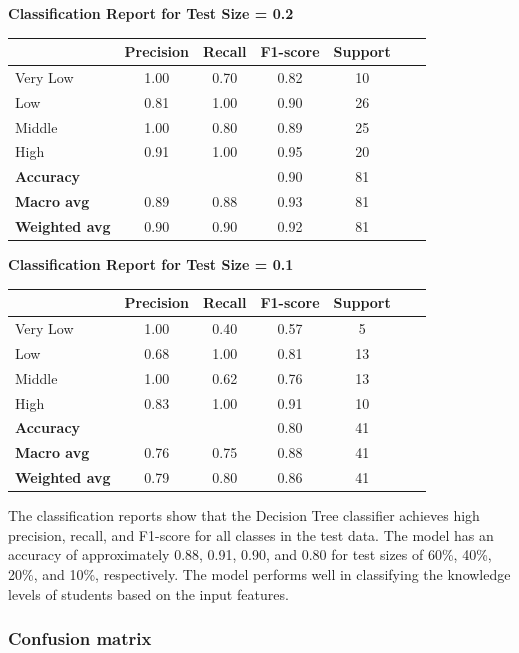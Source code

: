 \vspace{2em}

\textbf{Classification Report for Test Size = 0.2}

\begin{tabular}{lcccccc}
\hline
 & \textbf{Precision} & \textbf{Recall} & \textbf{F1-score} & \textbf{Support} \\
\hline
Very Low & 1.00 & 0.70 & 0.82 & 10 \\
Low & 0.81 & 1.00 & 0.90 & 26 \\
Middle & 1.00 & 0.80 & 0.89 & 25 \\
High & 0.91 & 1.00 & 0.95 & 20 \\
\hline
\textbf{Accuracy} & & & 0.90 & 81 \\
\textbf{Macro avg} & 0.89 & 0.88 & 0.93 & 81 \\
\textbf{Weighted avg} & 0.90 & 0.90 & 0.92 & 81 \\
\hline
\end{tabular}

\vspace{200em}

\textbf{Classification Report for Test Size = 0.1}

\begin{tabular}{lcccccc}
\hline
 & \textbf{Precision} & \textbf{Recall} & \textbf{F1-score} & \textbf{Support} \\
\hline
Very Low & 1.00 & 0.40 & 0.57 & 5 \\
Low & 0.68 & 1.00 & 0.81 & 13 \\
Middle & 1.00 & 0.62 & 0.76 & 13 \\
High & 0.83 & 1.00 & 0.91 & 10 \\
\hline
\textbf{Accuracy} & & & 0.80 & 41 \\
\textbf{Macro avg} & 0.76 & 0.75 & 0.88 & 41 \\
\textbf{Weighted avg} & 0.79 & 0.80 & 0.86 & 41 \\
\hline
\end{tabular}

The classification reports show that the Decision Tree classifier achieves high precision, recall, and F1-score for all classes in the test data. The model has an accuracy of approximately 0.88, 0.91, 0.90, and 0.80 for test sizes of 60\%, 40\%, 20\%, and 10\%, respectively. The model performs well in classifying the knowledge levels of students based on the input features.

\subsubsection{Confusion matrix}


